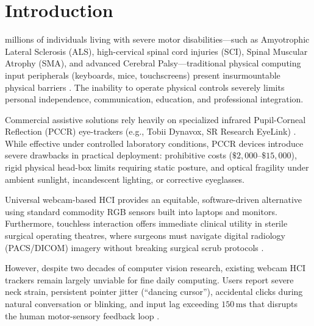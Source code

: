\documentclass[conference]{IEEEtran}
\begin{document}
\section{Introduction}
 millions of individuals living with severe motor disabilities—such as Amyotrophic Lateral Sclerosis (ALS), high-cervical spinal cord injuries (SCI), Spinal Muscular Atrophy (SMA), and advanced Cerebral Palsy—traditional physical computing input peripherals (keyboards, mice, touchscreens) present insurmountable physical barriers \cite{casiez2012}. The inability to operate physical controls severely limits personal independence, communication, education, and professional integration.

Commercial assistive solutions rely heavily on specialized infrared Pupil-Corneal Reflection (PCCR) eye-trackers (e.g., Tobii Dynavox, SR Research EyeLink) \cite{hansen2010}. While effective under controlled laboratory conditions, PCCR devices introduce severe drawbacks in practical deployment: prohibitive costs ($\$2,000$--$\$15,000$), rigid physical head-box limits requiring static posture, and optical fragility under ambient sunlight, incandescent lighting, or corrective eyeglasses. 

Universal webcam-based HCI provides an equitable, software-driven alternative using standard commodity RGB sensors built into laptops and monitors. Furthermore, touchless interaction offers immediate clinical utility in sterile surgical operating theatres, where surgeons must navigate digital radiology (PACS/DICOM) imagery without breaking surgical scrub protocols \cite{maggio2020}.

However, despite two decades of computer vision research, existing webcam HCI trackers remain largely unviable for fine daily computing. Users report severe neck strain, persistent pointer jitter (``dancing cursor''), accidental clicks during natural conversation or blinking, and input lag exceeding $150\,\text{ms}$ that disrupts the human motor-sensory feedback loop \cite{mackenzie1992}.
\end{document}
